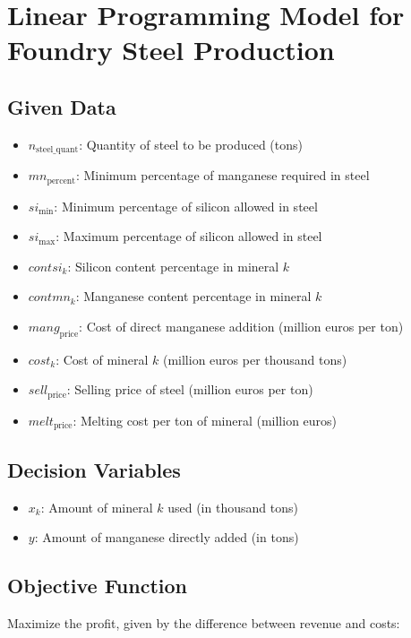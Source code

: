 \documentclass{article}
\begin{document}
\section*{Linear Programming Model for Foundry Steel Production}

\subsection*{Given Data}
\begin{itemize}
    \item $n_{\text{steel\_quant}}$: Quantity of steel to be produced (tons)
    \item $mn_{\text{percent}}$: Minimum percentage of manganese required in steel
    \item $si_{\text{min}}$: Minimum percentage of silicon allowed in steel
    \item $si_{\text{max}}$: Maximum percentage of silicon allowed in steel
    \item $contsi_k$: Silicon content percentage in mineral $k$
    \item $contmn_k$: Manganese content percentage in mineral $k$
    \item $mang_{\text{price}}$: Cost of direct manganese addition (million euros per ton)
    \item $cost_k$: Cost of mineral $k$ (million euros per thousand tons)
    \item $sell_{\text{price}}$: Selling price of steel (million euros per ton)
    \item $melt_{\text{price}}$: Melting cost per ton of mineral (million euros)
\end{itemize}

\subsection*{Decision Variables}
\begin{itemize}
    \item $x_k$: Amount of mineral $k$ used (in thousand tons)
    \item $y$: Amount of manganese directly added (in tons)
\end{itemize}

\subsection*{Objective Function}
Maximize the profit, given by the difference between revenue and costs:
\end{document}
